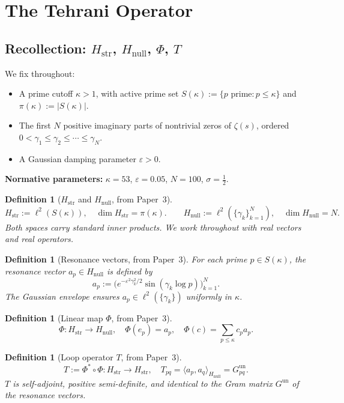\documentclass[11pt]{article}
\newtheorem{definition}[theorem]{Definition}
\newcommand{\Hstr}{H_{\mathrm{str}}}
\newcommand{\Hnull}{H_{\mathrm{null}}}
\newcommand{\Gun}{G^{\mathrm{un}}}
\begin{document}
\section{The Tehrani Operator}

\subsection{Recollection: $\Hstr$, $\Hnull$, $\Phi$, $T$}

We fix throughout:
\begin{itemize}
\item A prime cutoff $\kappa > 1$, with active prime set
  $S(\kappa) := \{p\text{ prime}: p\leq\kappa\}$
  and $\pi(\kappa) := |S(\kappa)|$.
\item The first $N$ positive imaginary parts of nontrivial zeros of
  $\zeta(s)$, ordered $0 < \gamma_1 \leq \gamma_2 \leq \cdots \leq \gamma_N$.
\item A Gaussian damping parameter $\varepsilon > 0$.
\end{itemize}

\textbf{Normative parameters:} $\kappa=53$, $\varepsilon=0.05$,
$N=100$, $\sigma=\tfrac{1}{2}$.

\begin{definition}[$\Hstr$ and $\Hnull$, from Paper~3]
\[
\Hstr := \ell^2(S(\kappa)),\quad \dim\Hstr = \pi(\kappa).
\qquad
\Hnull := \ell^2(\{\gamma_k\}_{k=1}^N),\quad \dim\Hnull = N.
\]
Both spaces carry standard inner products.
We work throughout with real vectors and real operators.
\end{definition}

\begin{definition}[Resonance vectors, from Paper~3]
For each prime $p\in S(\kappa)$, the \emph{resonance vector}
$a_p\in\Hnull$ is defined by
\[
a_p := \bigl(e^{-\varepsilon^2\gamma_k^2/2}\sin(\gamma_k\log p)\bigr)_{k=1}^N.
\]
The Gaussian envelope ensures $a_p\in\ell^2(\{\gamma_k\})$ uniformly
in $\kappa$.
\end{definition}

\begin{definition}[Linear map $\Phi$, from Paper~3]
\[
\Phi\colon\Hstr\to\Hnull,\quad
\Phi(e_p) = a_p,\quad
\Phi(c) = \sum_{p\leq\kappa}c_p a_p.
\]
\end{definition}

\begin{definition}[Loop operator $T$, from Paper~3]
\[
T := \Phi^*\circ\Phi\colon\Hstr\to\Hstr,\quad
T_{pq} = \langle a_p,a_q\rangle_{\Hnull} = G^{\mathrm{un}}_{pq}.
\]
$T$ is self-adjoint, positive semi-definite, and identical to the Gram
matrix $\Gun$ of the resonance vectors.
\end{definition}
\end{document}
